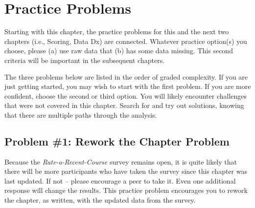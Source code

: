 \documentclass[
  11pt,
]{book}
\begin{document}
\hypertarget{practice-problems}{%
\section{Practice Problems}\label{practice-problems}}

Starting with this chapter, the practice problems for this and the next two chapters (i.e., Scoring, Data Dx) are connected. Whatever practice option(s) you choose, please (a) use raw data that (b) has some data missing. This second criteria will be important in the subsequent chapters.

The three problems below are listed in the order of graded complexity. If you are just getting started, you may wish to start with the first problem. If you are more confident, choose the second or third option. You will likely encounter challenges that were not covered in this chapter. Search for and try out solutions, knowing that there are multiple paths through the analysis.

\hypertarget{problem-1-rework-the-chapter-problem}{%
\subsection{Problem \#1: Rework the Chapter Problem}\label{problem-1-rework-the-chapter-problem}}

Because the \emph{Rate-a-Recent-Course} survey remains open, it is quite likely that there will be more participants who have taken the survey since this chapter was last updated. If not -- please encourage a peer to take it. Even one additional response will change the results. This practice problem encourages you to rework the chapter, as written, with the updated data from the survey.
\end{document}
